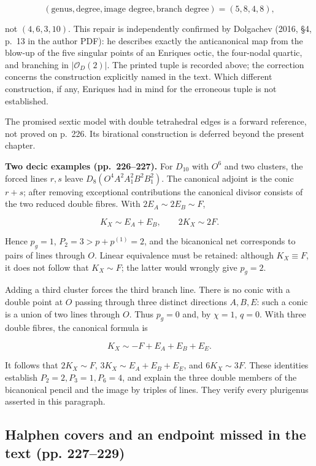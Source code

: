 \[
(\text{genus},\text{degree},\text{image degree},\text{branch degree})
=(5,8,4,8),
\]

not \((4,6,3,10)\). This repair is independently confirmed by Dolgachev (2016, §4, p.~13 in the author PDF): he describes exactly the anticanonical map from the blow-up of the five singular points of an Enriques octic, the four-nodal quartic, and branching in \(|\mathcal O_D(2)|\). The printed tuple is recorded above; the correction concerns the construction explicitly named in the text. Which different construction, if any, Enriques had in mind for the erroneous tuple is not established.

The promised sextic model with double tetrahedral edges is a forward reference, not proved on p.~226. Its birational construction is deferred beyond the present chapter.

\textbf{Two decic examples (pp.~226--227).} For \(D_{10}\) with \(O^6\) and two clusters, the forced lines \(r,s\) leave \(D_8(O^4A^2A_1^2B^2B_1^2)\). The canonical adjoint is the conic \(r+s\); after removing exceptional contributions the canonical divisor consists of the two reduced double fibres. With \(2E_A\sim2E_B\sim F\),

\[
K_X\sim E_A+E_B,\qquad 2K_X\sim2F.
\]

Hence \(p_g=1\), \(P_2=3>p+p^{(1)}=2\), and the bicanonical net corresponds to pairs of lines through \(O\). Linear equivalence must be retained: although \(K_X\equiv F\), it does not follow that \(K_X\sim F\); the latter would wrongly give \(p_g=2\).

Adding a third cluster forces the third branch line. There is no conic with a double point at \(O\) passing through three distinct directions \(A,B,E\): such a conic is a union of two lines through \(O\). Thus \(p_g=0\) and, by \(\chi=1\), \(q=0\). With three double fibres, the canonical formula is

\[
K_X\sim-F+E_A+E_B+E_E.
\]

It follows that \(2K_X\sim F\), \(3K_X\sim E_A+E_B+E_E\), and \(6K_X\sim3F\). These identities establish \(P_2=2,P_3=1,P_6=4\), and explain the three double members of the bicanonical pencil and the image by triples of lines. They verify every plurigenus asserted in this paragraph.

\subsection{Halphen covers and an endpoint missed in the text (pp. 227–229)}

